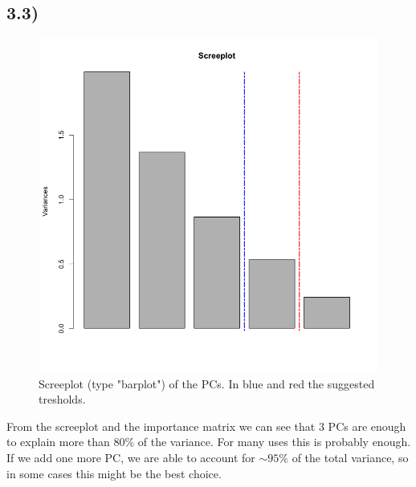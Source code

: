 \documentclass[a4paper,11pt,oneside]{report}
\begin{document}
\subsection*{3.3)}
	\begin{figure}[H]
	\centering
	\includegraphics[height = 11cm, width = 15cm]{screeplot_bar.png}
	\caption{Screeplot (type "barplot") of the PCs. In blue and red the suggested tresholds.}
	\end{figure}
	From the screeplot and the importance matrix we can see that 3 PCs are enough to explain more than 80\% of the variance. For many uses this is probably enough. If we add one more PC, we are able to account for $\sim95\%$ of the total variance, so in some cases this might be the best choice.
\end{document}
